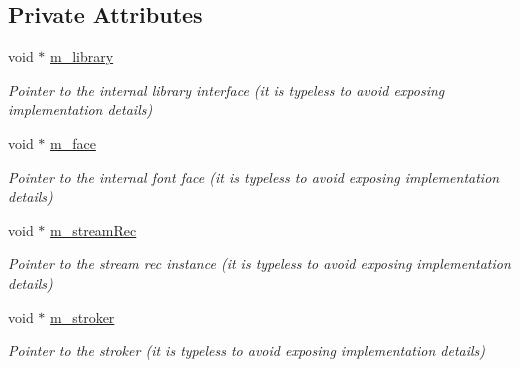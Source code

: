 \subsection*{Private Attributes}
\begin{DoxyCompactItemize}
\item 
\mbox{\label{classsf_1_1_font_a042bbb1f964c70a0787ec2e336c9feb8}} 
void $\ast$ \mbox{\hyperlink{classsf_1_1_font_a042bbb1f964c70a0787ec2e336c9feb8}{m\+\_\+library}}
\begin{DoxyCompactList}\small\item\em Pointer to the internal library interface (it is typeless to avoid exposing implementation details) \end{DoxyCompactList}\item 
\mbox{\label{classsf_1_1_font_aa157c2c17cc8f4decc808d9a02186753}} 
void $\ast$ \mbox{\hyperlink{classsf_1_1_font_aa157c2c17cc8f4decc808d9a02186753}{m\+\_\+face}}
\begin{DoxyCompactList}\small\item\em Pointer to the internal font face (it is typeless to avoid exposing implementation details) \end{DoxyCompactList}\item 
\mbox{\label{classsf_1_1_font_a30f92ea380da85268368b726276f9fc9}} 
void $\ast$ \mbox{\hyperlink{classsf_1_1_font_a30f92ea380da85268368b726276f9fc9}{m\+\_\+stream\+Rec}}
\begin{DoxyCompactList}\small\item\em Pointer to the stream rec instance (it is typeless to avoid exposing implementation details) \end{DoxyCompactList}\item 
\mbox{\label{classsf_1_1_font_a849d785f4770cbcfcdd80c3707a080d2}} 
void $\ast$ \mbox{\hyperlink{classsf_1_1_font_a849d785f4770cbcfcdd80c3707a080d2}{m\+\_\+stroker}}
\begin{DoxyCompactList}\small\item\em Pointer to the stroker (it is typeless to avoid exposing implementation details) \end{DoxyCompactList}\item 
\mbox{\label{classsf_1_1_font_adc98033870d4eb40872e78eeac4e1c24}} 

\end{DoxyCompactItemize}
